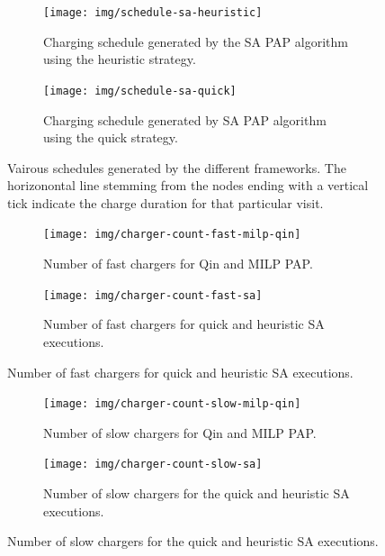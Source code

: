 \documentclass[energies,article,submit,moreauthors]{Definitions/mdpi}
\begin{document}
\begin{figure} \ContinuedFloat
  \centering

  \begin{subfigure}[t]{\textwidth}
    \centering \texttt{[image: img/schedule-sa-heuristic]}
    \caption{Charging schedule generated by the SA PAP algorithm using the heuristic strategy.}
    \label{subfig:schedule-heuristic-sa}
  \end{subfigure}

  \hfill

  \begin{subfigure}[t]{\textwidth}
    \centering \texttt{[image: img/schedule-sa-quick]}
    \caption{Charging schedule generated by SA PAP algorithm using the quick strategy.}
    \label{subfig:schedule-quick-sa}
  \end{subfigure}
  \caption{Vairous schedules generated by the different frameworks. The horizonontal line stemming from the nodes ending with a vertical tick indicate the charge duration for that particular visit.}
  \label{fig:schedule}
\end{figure}

\begin{figure}
    \begin{subfigure}[t]{\textwidth}
    \centering
        \texttt{[image: img/charger-count-fast-milp-qin]}
        \caption{Number of fast chargers for Qin and MILP PAP.}
        \label{subfig:fast-charger-usage-milp-qinn}
    \end{subfigure}

    \begin{subfigure}[t]{\textwidth}
    \centering
        \texttt{[image: img/charger-count-fast-sa]}
        \caption{Number of fast chargers for quick and heuristic SA executions.}
        \label{subfig:fast-charger-usage-sa}
    \end{subfigure}
\end{figure}

\begin{figure}
    \begin{subfigure}[t]{\textwidth}
    \centering
        \texttt{[image: img/charger-count-slow-milp-qin]}
        \caption{Number of slow chargers for Qin and MILP PAP.}
        \label{subfig:slow-charger-usage-milp-qinn}
    \end{subfigure}
    \begin{subfigure}[t]{\textwidth}
    \centering
        \texttt{[image: img/charger-count-slow-sa]}
        \caption{Number of slow chargers for the quick and heuristic SA executions.}
        \label{subfig:slow-charger-usage-sa}
    \end{subfigure}
\end{figure}
\end{document}
